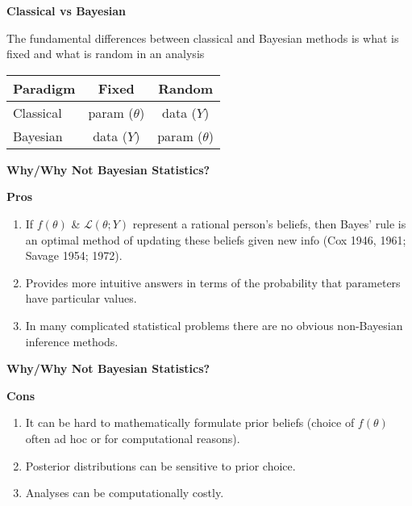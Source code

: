 \documentclass[12pt,xcolor=svgnames]{beamer}
\newcommand{\bl}{\color{blue}}
\newcommand{\theme}{\color{FireBrick}}
\newcommand{\sk}{\vspace{.4cm}}
\newcommand{\chap}[1]{{\theme \Large \bf #1} \sk}
\begin{document}
\begin{frame}
\chap{Classical vs Bayesian} 

The fundamental differences between classical and Bayesian methods is what is fixed and what is random in an analysis

\sk
\sk
\begin{center}
\begin{tabular}{|l|c|c|}
\hline
Paradigm & Fixed & Random \\
\hline
Classical & param ($\theta$) & data ($Y$)\\
\hline
Bayesian & data ($Y$) & param ($\theta$)\\
\hline
\end{tabular}
\end{center}
\end{frame}


\begin{frame}
\chap{Why/Why Not Bayesian Statistics?} 

{\bf \bl Pros}
\begin{enumerate}
\item If $f(\theta)$ \& $\mathcal{L}(\theta; Y)$ represent a rational person's beliefs, then Bayes' rule is an optimal method of updating these beliefs given new info (Cox 1946, 1961; Savage 1954; 1972).
\item Provides more intuitive answers in terms of the probability that parameters have particular values. 
\item In many complicated statistical problems there are no obvious non-Bayesian inference methods.
\end{enumerate}

\end{frame}


\begin{frame}
\chap{Why/Why Not Bayesian Statistics?} 


{\bf \bl Cons}
\begin{enumerate}
\item It can be hard to mathematically formulate prior beliefs (choice of $f(\theta)$ often ad hoc or for computational reasons).
\item Posterior distributions can be sensitive to prior choice.
\item Analyses can be computationally costly.
\end{enumerate}

\end{frame}
\end{document}
